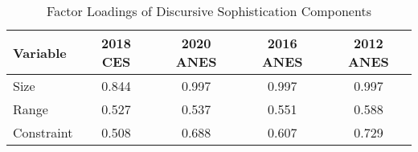 \begin{table}[ht]
\centering
\begin{tabular}{lcccc}
  \hline
Variable & 2018 CES & 2020 ANES & 2016 ANES & 2012 ANES \\ 
  \hline
Size & 0.844 & 0.997 & 0.997 & 0.997 \\ 
  Range & 0.527 & 0.537 & 0.551 & 0.588 \\ 
  Constraint & 0.508 & 0.688 & 0.607 & 0.729 \\ 
   \hline
\end{tabular}
\caption{Factor Loadings of Discursive Sophistication Components} 
\label{app:factload}
\end{table}
